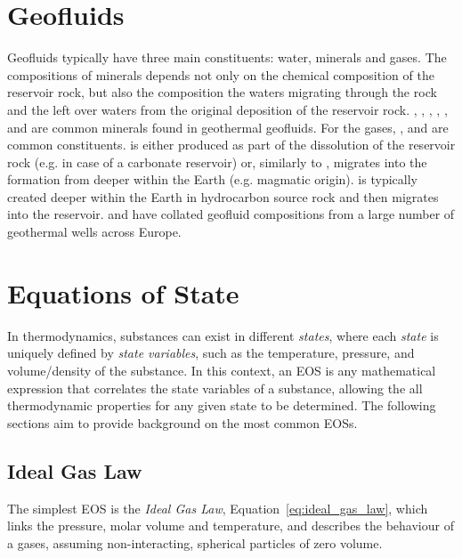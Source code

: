 
\section{Geofluids}
\label{sec:pure_fluids}
    Geofluids typically have three main constituents: water, minerals and gases\cite{DiPippo2016}. The compositions of minerals depends not only on the chemical composition of the reservoir rock, but also the composition the waters migrating through the rock and the left over waters from the original deposition of the reservoir rock. , , , , ,  and  are common minerals found in geothermal geofluids. For the gases, ,  and  are common constituents.  is either produced as part of the dissolution of the reservoir rock (e.g. in case of a carbonate reservoir) or, similarly to , migrates into the formation from deeper within the Earth (e.g. magmatic origin).  is typically created deeper within the Earth in hydrocarbon source rock and then migrates into the reservoir. \citeauthor{kottsova_2022} \cite{kottsova_2022} and \citeauthor{REFLECT_2022} \cite{REFLECT_2022} have collated geofluid compositions from a large number of geothermal wells across Europe. 
    
\section{Equations of State}
\label{sec:equations_of_state}
    In thermodynamics, substances can exist in different \emph{states}, where each \emph{state} is uniquely defined by \emph{state variables}, such as the temperature, pressure, and volume/density of the substance. In this context, an \ac{EOS} is any mathematical expression that correlates the state variables of a substance, allowing the all thermodynamic properties for any given state to be determined. The following sections aim to provide background on the most common \acp{EOS}.
    
    \subsection{Ideal Gas Law}
        The simplest \ac{EOS} is the \emph{Ideal Gas Law}, Equation~\ref{eq:ideal_gas_law}, which links the pressure, molar volume and temperature, and describes the behaviour of a gases, assuming non-interacting, spherical particles of zero volume. 
        
